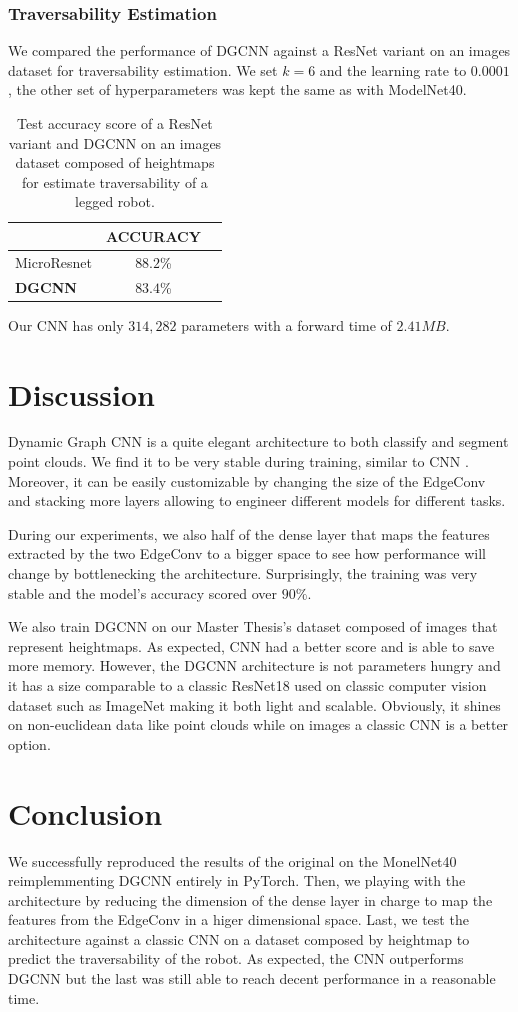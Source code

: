 \documentclass[twocolumn,showpacs,
  nofootinbib,aps,superscriptaddress,
  eqsecnum,prd,notitlepage,showkeys,10pt]{revtex4-1}
\begin{document}
\subsubsection{Traversability Estimation}
We compared the performance of DGCNN against a ResNet \cite{he2015deep} variant on an images dataset for traversability estimation. We set $k=6$ and the learning rate to $0.0001$, the other set of hyperparameters was kept the same as with ModelNet40.
\begin{table}[H]
  \centering
  \begin{tabular}{lcc}
    & ACCURACY \\
    \hline
    MicroResnet & $88.2$\%  \\
    \textbf{DGCNN} & $83.4$\%  \\
    \hline
  \end{tabular}
  \caption{Test accuracy score of a ResNet variant and DGCNN on an images dataset composed of heightmaps for estimate traversability of a legged robot.}
\end{table}
Our CNN has only $314,282$ parameters with a forward time of $2.41MB$.
\section{Discussion}
Dynamic Graph CNN is a quite elegant architecture to both classify and segment point clouds. We find it to be very stable during training, similar to CNN . Moreover, it can be easily customizable by changing the size of the EdgeConv and stacking more layers allowing to engineer different models for different tasks.

During our experiments, we also half of the dense layer that maps the features extracted by the two EdgeConv to a bigger space to see how performance will change by bottlenecking the architecture. Surprisingly, the training was very stable and the model's accuracy scored over $90\%$. 

We also train DGCNN on our Master Thesis's dataset composed of images that represent heightmaps. As expected, CNN had a better score and is able to save more memory. However, the DGCNN architecture is not parameters hungry and it has a size comparable to a classic ResNet18 used on classic computer vision dataset such as ImageNet \cite{imagenet} making it both light and scalable. Obviously, it shines on non-euclidean data like point clouds while on images a classic CNN is a better option. 

\section{Conclusion}
We successfully reproduced the results of the original on the MonelNet40 reimplemmenting DGCNN entirely in PyTorch. Then, we playing with the architecture by reducing the dimension of the dense layer in charge to map the features from the EdgeConv in a higer dimensional space. Last, we test the architecture against a classic CNN on a dataset composed by heightmap to predict the traversability of the robot. As expected, the CNN outperforms DGCNN but the last was still able to reach decent performance in a reasonable time.
\newpage

\end{document}
